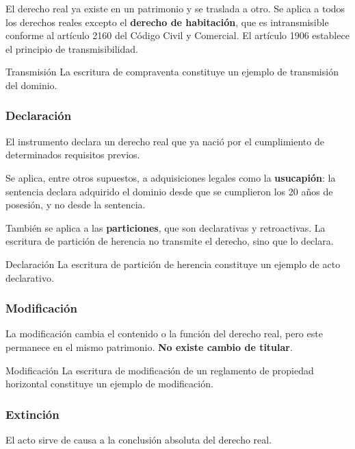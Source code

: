 \documentclass[12pt,oneside]{book}
\begin{document}
El derecho real ya existe en un patrimonio y se traslada a otro. Se aplica a todos los derechos reales excepto el \textbf{derecho de habitación}, que es intransmisible conforme al artículo 2160 del Código Civil y Comercial. El artículo 1906 establece el principio de transmisibilidad.

\begin{example}{Transmisión}
La escritura de compraventa constituye un ejemplo de transmisión del dominio.
\end{example}

\subsubsection{Declaración}

El instrumento declara un derecho real que ya nació por el cumplimiento de determinados requisitos previos.

Se aplica, entre otros supuestos, a adquisiciones legales como la \textbf{usucapión}: la sentencia declara adquirido el dominio desde que se cumplieron los 20 años de posesión, y no desde la sentencia.

También se aplica a las \textbf{particiones}, que son declarativas y retroactivas. La escritura de partición de herencia no transmite el derecho, sino que lo declara.

\begin{example}{Declaración}
La escritura de partición de herencia constituye un ejemplo de acto declarativo.
\end{example}

\subsubsection{Modificación}

La modificación cambia el contenido o la función del derecho real, pero este permanece en el mismo patrimonio. \textbf{No existe cambio de titular}.

\begin{example}{Modificación}
La escritura de modificación de un reglamento de propiedad horizontal constituye un ejemplo de modificación.
\end{example}

\subsubsection{Extinción}

El acto sirve de causa a la conclusión absoluta del derecho real.
\end{document}

